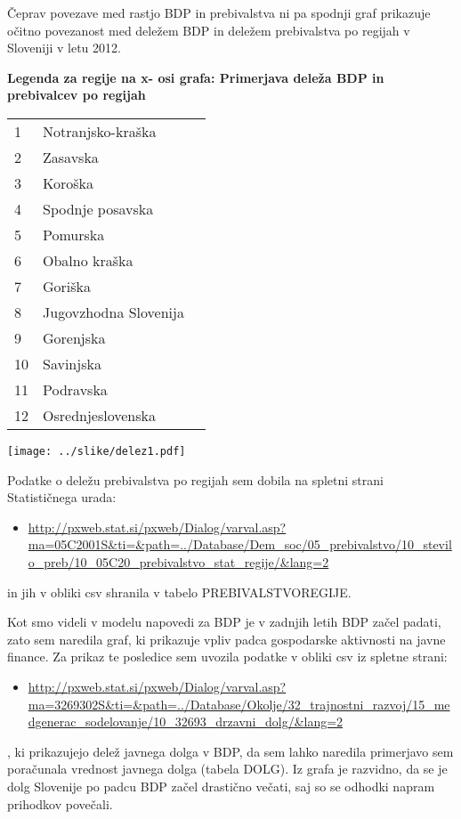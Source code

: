 \documentclass[a4paper, 11pt]{article}
\begin{document}
Čeprav povezave med rastjo BDP in prebivalstva ni pa spodnji graf prikazuje očitno povezanost med deležem BDP in deležem prebivalstva po regijah v Sloveniji v letu 2012. 

\newpage
\textbf{Legenda za regije na x- osi grafa: Primerjava deleža BDP in prebivalcev po regijah}
\begin{table}[h]
\begin{tabular}{lll}

1 & Notranjsko-kraška \\
2 & Zasavska\\
3 & Koroška \\
4 & Spodnje posavska\\
5 & Pomurska\\
6 & Obalno kraška \\
7 & Goriška \\
8 & Jugovzhodna Slovenija\\
9 & Gorenjska \\
10 & Savinjska \\
11 & Podravska\\
12 & Osrednjeslovenska \\

\end{tabular}
\end{table}

\begin{center}
\texttt{[image: ../slike/delez1.pdf]}
\end{center}
Podatke o deležu prebivalstva po regijah sem dobila na spletni strani Statističnega urada:
\begin{itemize}
\item{\url{http://pxweb.stat.si/pxweb/Dialog/varval.asp?ma=05C2001S&ti=&path=../Database/Dem_soc/05_prebivalstvo/10_stevilo_preb/10_05C20_prebivalstvo_stat_regije/&lang=2}} 
\end{itemize}
in jih v obliki csv shranila v tabelo PREBIVALSTVOREGIJE.

Kot smo videli v modelu napovedi za BDP je v zadnjih letih BDP začel padati, zato sem naredila graf, ki prikazuje vpliv padca gospodarske aktivnosti na javne finance.
Za prikaz te posledice sem uvozila podatke v obliki csv iz spletne strani:
\begin{itemize}
\item{\url{http://pxweb.stat.si/pxweb/Dialog/varval.asp?ma=3269302S&ti=&path=../Database/Okolje/32_trajnostni_razvoj/15_medgenerac_sodelovanje/10_32693_drzavni_dolg/&lang=2}}
\end{itemize}
, ki prikazujejo delež javnega dolga v BDP, da sem lahko naredila primerjavo sem poračunala vrednost javnega dolga (tabela DOLG).
Iz grafa je razvidno, da se je dolg Slovenije po padcu BDP začel drastično večati, saj so se odhodki napram prihodkov povečali.
\end{document}

